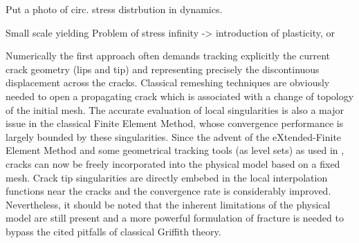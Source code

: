 Put a photo of circ. stress distrbution in dynamics.

Small scale yielding
Problem of stress infinity -> introduction of plasticity, or

Numerically the first approach often demands tracking explicitly the current crack geometry (lips and tip) and representing precisely the discontinuous displacement across the cracks. Classical remeshing techniques \cite{ShahaniAmini:2009} are obviously needed to open a propagating crack which is associated with a change of topology of the initial mesh. The accurate evaluation of local singularities is also a major issue in the classical Finite Element Method, whose convergence performance is largely bounded by these singularities. Since the advent of the eXtended-Finite Element Method and some geometrical tracking tools (as level sets) as used in \cite{RethoreGravouilCombescure:2005,GregoireMaigreRethoreCombescure:2007,MenouillardRethoreCombescureBung:2006}, cracks can now be freely incorporated into the physical model based on a fixed mesh. Crack tip singularities are directly embebed in the local interpolation functions near the cracks and the convergence rate is considerably improved. Nevertheless, it should be noted that the inherent limitations of the physical model are still present and a more powerful formulation of fracture is needed to bypass the cited pitfalls of classical Griffith theory.

